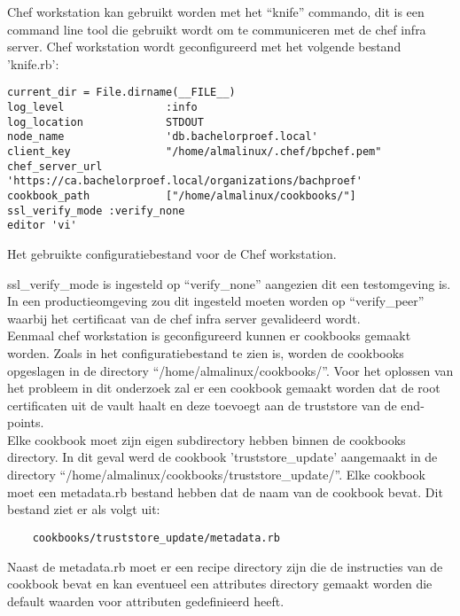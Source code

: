 Chef workstation kan gebruikt worden met het ``knife'' commando, dit is een command line tool die gebruikt wordt om te communiceren met de chef infra server.
Chef workstation wordt geconfigureerd met het volgende bestand 'knife.rb':
\begin{listing}[H]
\begin{verbatim}
current_dir = File.dirname(__FILE__)
log_level                :info
log_location             STDOUT
node_name                'db.bachelorproef.local'
client_key               "/home/almalinux/.chef/bpchef.pem"
chef_server_url          'https://ca.bachelorproef.local/organizations/bachproef'
cookbook_path            ["/home/almalinux/cookbooks/"]
ssl_verify_mode :verify_none
editor 'vi'
\end{verbatim}
\caption[Configuratie voor de Chef Workstation]{Het gebruikte configuratiebestand voor de Chef workstation.}
\end{listing}

ssl\_verify\_mode is ingesteld op ``verify\_none'' aangezien dit een testomgeving is. In een productieomgeving zou dit ingesteld moeten worden op ``verify\_peer'' waarbij het certificaat van de chef infra server gevalideerd wordt. \\

Eenmaal chef workstation is geconfigureerd kunnen er cookbooks gemaakt worden. Zoals in het configuratiebestand te zien is, worden de cookbooks opgeslagen in de directory ``/home/almalinux/cookbooks/''.
Voor het oplossen van het probleem in dit onderzoek zal er een cookbook gemaakt worden dat de root certificaten uit de vault haalt en deze toevoegt aan de truststore van de end-points. \\

Elke cookbook moet zijn eigen subdirectory hebben binnen de cookbooks directory.
In dit geval werd de cookbook 'truststore\_update' aangemaakt in de directory ``/home/almalinux/cookbooks/truststore\_update/''. Elke cookbook moet een metadata.rb bestand hebben dat de naam van de cookbook bevat. Dit bestand ziet er als volgt uit:
\begin{verbatim}
    cookbooks/truststore_update/metadata.rb
\end{verbatim}

Naast de metadata.rb moet er een recipe directory zijn die de instructies van de cookbook bevat en kan eventueel een attributes directory gemaakt worden die default waarden voor attributen gedefinieerd heeft. \\

